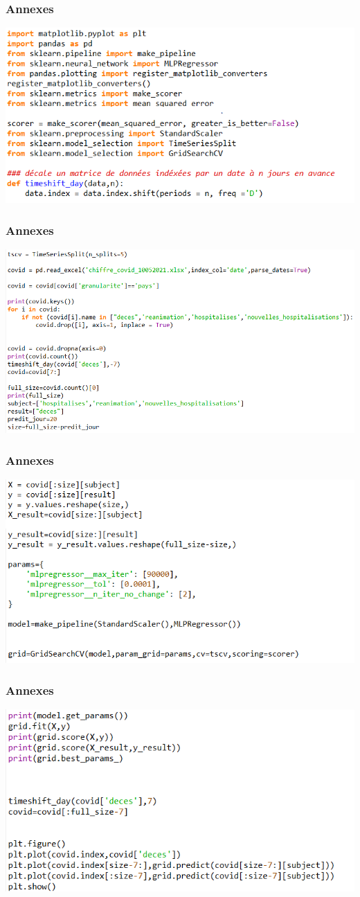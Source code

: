 \documentclass{beamer}[aspectratio = 43]
\begin{document}
\begin{frame}
	\frametitle{Annexes}
	\includegraphics[scale=0.65]{code_nn0}
\end{frame}

\begin{frame}
	\frametitle{Annexes}
	\includegraphics[scale=0.60]{code_nn1}
\end{frame}

\begin{frame}
	\frametitle{Annexes}
	\includegraphics[scale=0.65]{code_nn2}
\end{frame}

\begin{frame}
	\frametitle{Annexes}
	\includegraphics[scale=0.65]{code_nn3}
\end{frame}
\end{document}
